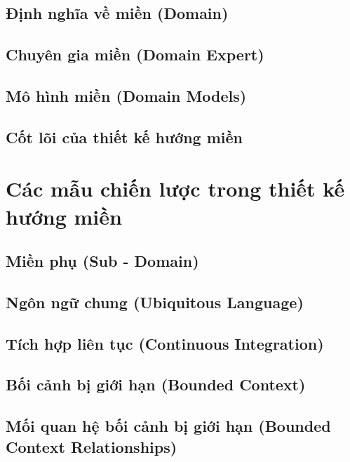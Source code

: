 \documentclass{report} %
\begin{document}
\subsection{Định nghĩa về miền (Domain)}

\subsection{Chuyên gia miền (Domain Expert)}

\subsection{Mô hình miền (Domain Models)}

\subsection{Cốt lõi của thiết kế hướng miền}


\newpage
\section{Các mẫu chiến lược trong thiết kế hướng miền}

\subsection{Miền phụ (Sub - Domain)}

\subsection{Ngôn ngữ chung (Ubiquitous Language)}

\subsection{Tích hợp liên tục (Continuous Integration)}

\subsection{Bối cảnh bị giới hạn (Bounded Context)}

\subsection{Mối quan hệ bối cảnh bị giới hạn (Bounded Context Relationships)}

\end{document}
